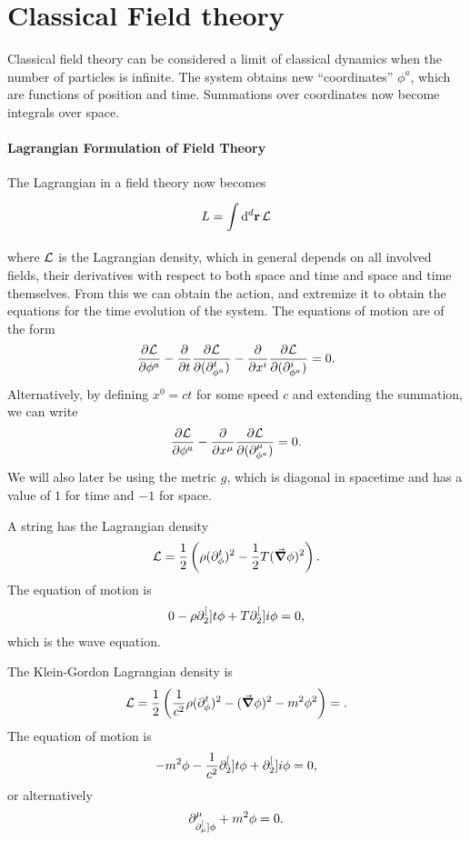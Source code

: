 \section{Classical Field theory}

Classical field theory can be considered a limit of classical dynamics when the number of particles is infinite. The system obtains new ``coordinates'' $\phi^{a}$, which are functions of position and time. Summations over coordinates now become integrals over space.

\paragraph{Lagrangian Formulation of Field Theory}
The Lagrangian in a field theory now becomes
\begin{align*}
	L = \int\limits_{}^{}\dd[d]{\vb{r}}\mathcal{L}
\end{align*}
where $\mathcal{L}$ is the Lagrangian density, which in general depends on all involved fields, their derivatives with respect to both space and time and space and time themselves. From this we can obtain the action, and extremize it to obtain the equations for the time evolution of the system. The equations of motion are of the form
\begin{align*}
	\pdv{\ensuremath{\mathcal{L}}}{\phi^{a}} - \pdv{t}\pdv{\ensuremath{\mathcal{L}}}{(\ensuremath{\partial^{t}_{\phi^{a}}})} - \pdv{x^{i}}\pdv{\ensuremath{\mathcal{L}}}{(\ensuremath{\partial^{i}_{\phi^{a}}})} = 0.
\end{align*}
Alternatively, by defining $x^{0} = ct$ for some speed $c$ and extending the summation, we can write
\begin{align*}
	\pdv{\ensuremath{\mathcal{L}}}{\phi^{a}} - \pdv{x^{\mu}}\pdv{\ensuremath{\mathcal{L}}}{(\ensuremath{\partial^{\mu}_{\phi^{a}}})} = 0.
\end{align*}
We will also later be using the metric $g$, which is diagonal in spacetime and has a value of $1$ for time and $-1$ for space.

A string has the Lagrangian density
\begin{align*}
	\mathcal{L} = \frac{1}{2}\left(\rho(\partial^{t}_{\phi})^{2} - \frac{1}{2}T(\grad{\phi})^{2}\right).
\end{align*}
The equation of motion is
\begin{align*}
	0 - \rho\partial^{[}_{2}]{t}{\phi} + T\partial^{[}_{2}]{i}{\phi} = 0,
\end{align*}
which is the wave equation.

The Klein-Gordon Lagrangian density is
\begin{align*}
	\mathcal{L} = \frac{1}{2}\left(\frac{1}{c^{2}}\rho(\partial^{t}_{\phi})^{2} - (\grad{\phi})^{2} - m^{2}\phi^{2}\right) = .
\end{align*}
The equation of motion is
\begin{align*}
	-m^{2}\phi - \frac{1}{c^{2}}\partial^{[}_{2}]{t}{\phi} + \partial^{[}_{2}]{i}{\phi} = 0,
\end{align*}
or alternatively
\begin{align*}
	\partial^{\mu}_{\partial^{[}_{\mu}]{}{\phi}} + m^{2}\phi = 0.
\end{align*}

